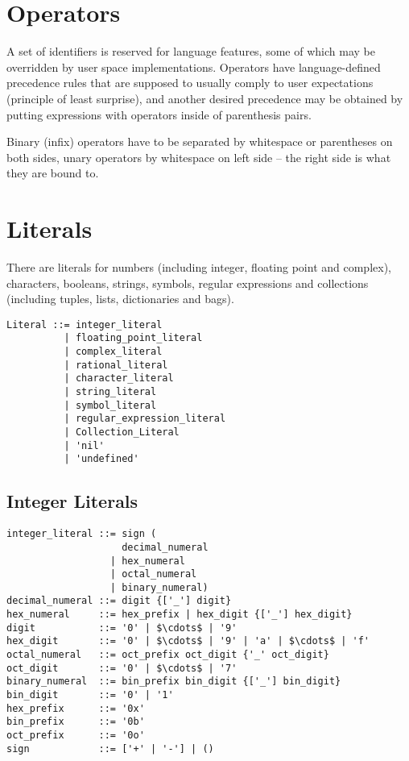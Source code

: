 \section{Operators}\label{sec:operators}
A set of identifiers is reserved for language features, some of which may be overridden by user space implementations. Operators have language-defined precedence rules that are supposed to usually comply to user expectations (principle of least surprise), and another desired precedence may be obtained by putting expressions with operators inside of parenthesis pairs. 

Binary (infix) operators have to be separated by whitespace or parentheses on both sides, unary operators by whitespace on left side -- the right side is what they are bound to. 






\section{Literals}\label{sec:literals}

There are literals for numbers (including integer, floating point and complex), characters, booleans, strings, symbols, regular expressions and collections (including tuples, lists, dictionaries and bags). 

\syntax\begin{lstlisting}
Literal ::= integer_literal
	      | floating_point_literal
	      | complex_literal
	      | rational_literal
	      | character_literal
	      | string_literal
	      | symbol_literal
	      | regular_expression_literal
	      | Collection_Literal
	      | 'nil'
	      | 'undefined'
\end{lstlisting}






\subsection{Integer Literals}\label{sec:integerliterals}

\syntax\begin{lstlisting}
integer_literal ::= sign (
                    decimal_numeral
                  | hex_numeral
                  | octal_numeral
                  | binary_numeral)
decimal_numeral ::= digit {['_'] digit}
hex_numeral     ::= hex_prefix | hex_digit {['_'] hex_digit}
digit           ::= '0' | $\cdots$ | '9'
hex_digit       ::= '0' | $\cdots$ | '9' | 'a' | $\cdots$ | 'f'
octal_numeral   ::= oct_prefix oct_digit {'_' oct_digit}
oct_digit       ::= '0' | $\cdots$ | '7'
binary_numeral  ::= bin_prefix bin_digit {['_'] bin_digit}
bin_digit       ::= '0' | '1'
hex_prefix      ::= '0x'
bin_prefix      ::= '0b'
oct_prefix      ::= '0o'
sign            ::= ['+' | '-'] | ()
\end{lstlisting}

